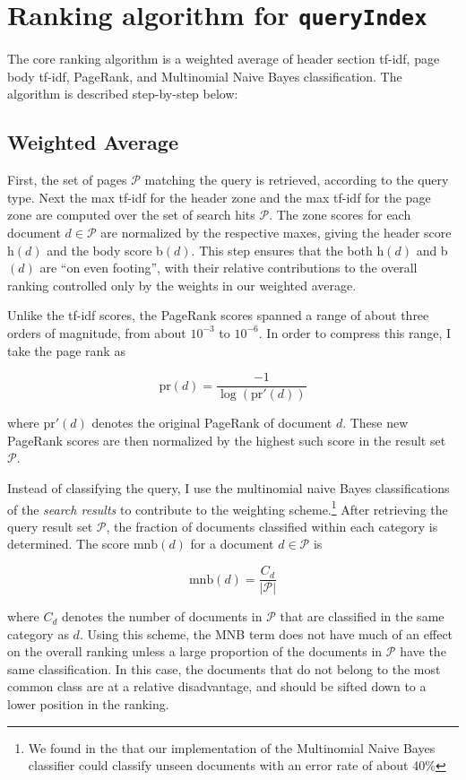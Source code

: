 \documentclass[11pt]{article}
\begin{document}
\section{Ranking algorithm for \texttt{queryIndex}}

The core ranking algorithm is a weighted average of header section tf-idf, page body tf-idf,
PageRank, and Multinomial Naive Bayes classification. The algorithm is described step-by-step below:

\subsection*{Weighted Average}

First, the set of pages $\mathcal{P}$ matching the query is retrieved, according to the query type.
Next the max tf-idf for the header zone and the max tf-idf for the page zone are computed over
the set of search hits $\mathcal{P}$. The zone scores for each document $d \in \mathcal{P}$ are normalized
by the respective maxes, giving the header score h$(d)$ and the body score b$(d)$. This step ensures that
the both h$(d)$ and b$(d)$ are ``on even footing'', with their relative contributions to the overall
ranking controlled only by the weights in our weighted average.

Unlike the tf-idf scores, the PageRank scores spanned a range of about three orders of magnitude,
from about $10^{-3}$ to $10^{-6}$. In order to compress this range, I take the page rank as

\[\text{pr}(d) = \frac{-1}{\log(\text{pr}'(d))}\]

where $\text{pr}'(d)$ denotes the original PageRank of document $d$. These new PageRank scores
are then normalized by the highest such score in the result set $\mathcal{P}$.

Instead of classifying the query, I use the multinomial naive Bayes classifications
of the \textit{search results} to contribute to the weighting scheme.\footnote{We found in the that our implementation of the
Multinomial Naive Bayes classifier could classify unseen documents with an error rate of about 40\%}
After retrieving the query result set $\mathcal{P}$,
the fraction of documents classified within each category is determined.
The score $\text{mnb}(d)$ for a document $d \in \mathcal{P}$ is 

\[\text{mnb}(d) = \frac{C_{d}}{|\mathcal{P}|}\]

where $C_{d}$ denotes the number of documents in $\mathcal{P}$ that are classified in the same category as $d$.
Using this scheme, the MNB term does not have much of an effect on the overall ranking unless a large proportion
of the documents in $\mathcal{P}$ have the same classification. In this case, the documents that do not belong to
the most common class are at a relative disadvantage, and should be sifted down to a lower position in the ranking.
\end{document}

